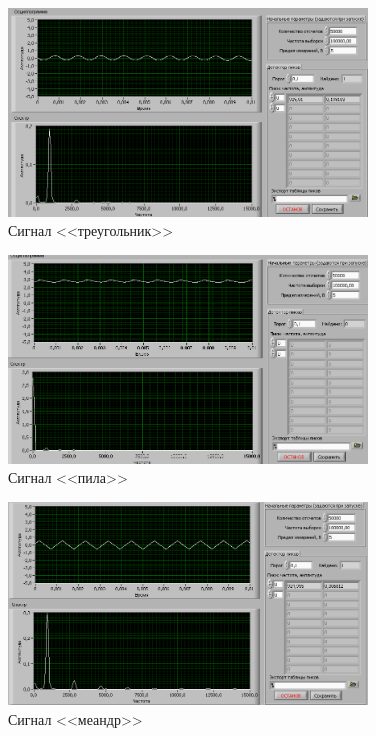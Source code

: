 \begin{figure}[H]
	\centering
	\includegraphics[width=0.85\textwidth]{pic/int/triangle.png}
	\caption{Сигнал <<треугольник>>}
	
\end{figure}
\begin{figure}[H]
	\centering
	\includegraphics[width=0.85\textwidth]{pic/int/pila.png}
	\caption{Сигнал <<пила>>}
	
\end{figure}
\begin{figure}[H]
	\centering
	\includegraphics[width=0.85\textwidth]{pic/int/meandr.png}
	\caption{Сигнал <<меандр>>}
	
\end{figure}

